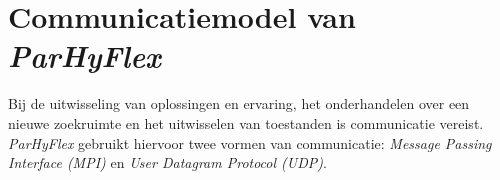\chapter{Communicatiemodel van \emph{ParHyFlex}}


Bij de uitwisseling van oplossingen en ervaring, het onderhandelen over een nieuwe zoekruimte en het uitwisselen van toestanden is communicatie vereist. \emph{ParHyFlex} gebruikt hiervoor twee vormen van communicatie: \emph{Message Passing Interface (MPI)} en \emph{User Datagram Protocol (UDP)}.












